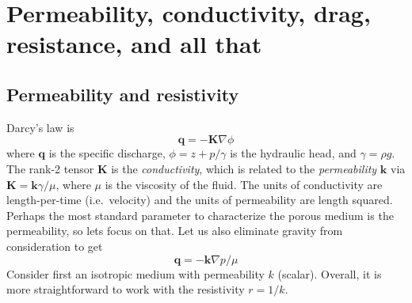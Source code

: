 \documentclass[11pt]{article}
\newcommand{\td}[2] { \frac{d #1} { d #2 } }
\newcommand{\grad}{\nabla}
\newcommand{\bvec}[1]{\ensuremath{\boldsymbol{#1}}}
\newcommand{\nhat}{\hat{\bvec{n}}}
\newcommand {\bq} {\bvec{q}}
\begin{document}
\begin{comment}
\subsubsection{The center of mass}
Consider the body's center of mass
\begin{equation}
(x_{cm}, y_{cm}) = \frac{1}{A} \iint (x, y) \, dA
\end{equation}
I did a calculation to determine the motion of the center of mass, given the interface velocity. The result that I get is
\begin{equation}
\td{}{t} (x_{cm}, y_{cm})  = -\frac{1}{A} \int (x(s), y(s)) V_n(s) \, ds
\end{equation}
I believe the sign is correct for $\nhat$ the inward pointing normal, so that $V_n$ is positive if the body is shrinking.
To calculate the center of mass, I can use the divergence theorem
\begin{equation}
\iint \grad \cdot \bvec{F} \, dA = \int \bvec{F} \cdot \nhat \, ds
\end{equation}
Take $\bvec{F} = \frac{1}{2} (x^2, y^2)$, so that $\grad \cdot \bvec{F} = (x,y)$. Then
\begin{equation}
(x_{cm}, y_{cm} ) = \frac{1}{2 A} \int x^2 n_x + y^2 n_y \, ds
\end{equation}
To calculate the total area, $A$, I can use the divergence theorem again, to get
\begin{equation}
A = \int x n_x ds = \int y n_y ds
\end{equation}
\end{comment}


\section{Permeability, conductivity, drag, resistance, and all that}

\subsection{Permeability and resistivity}
Darcy's law is
\begin{equation}
\bq = - \bvec{K} \grad \phi
\end{equation}
where $\bq$ is the specific discharge, $\phi = z + p/\gamma$ is the hydraulic head, and $\gamma = \rho g$. The rank-2 tensor $\bvec{K}$ is the {\em conductivity}, which is related to the {\em permeability} $\bvec{k}$ via $\bvec{K} = \bvec{k} \gamma/\mu$, where $\mu$ is the viscosity of the fluid. The units of conductivity are length-per-time (i.e.~velocity) and the units of permeability are length squared.
Perhaps the most standard parameter to characterize the porous medium is the permeability, so lets focus on that. Let us also eliminate gravity from consideration to get
\begin{equation}
\bq = - \bvec{k} \grad p / \mu
\end{equation}
Consider first an isotropic medium with permeability $k$ (scalar). Overall, it is more straightforward to work with the resistivity $r = 1/k$.
\end{document}
